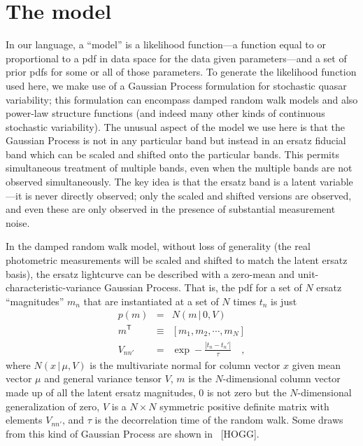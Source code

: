 \documentclass[letterpaper,12pt]{article}
\newcommand{\given}{\,|\,}
\newcommand{\transpose}[1]{{#1}^{\mathsf{T}}}
\begin{document}
\section{The model}

In our language, a ``model'' is a likelihood function---a function
equal to or proportional to a pdf in data space for the data given
parameters---and a set of prior pdfs for some or all of those
parameters.  To generate the likelihood function used here, we make
use of a Gaussian Process formulation for stochastic quasar
variability; this formulation can encompass damped random walk models
and also power-law structure functions (and indeed many other kinds of
continuous stochastic variability).  The unusual aspect of the model
we use here is that the Gaussian Process is not in any particular band
but instead in an ersatz fiducial band which can be scaled and shifted
onto the particular bands.  This permits simultaneous treatment of
multiple bands, even when the multiple bands are not observed
simultaneously.  The key idea is that the ersatz band is a latent
variable---it is never directly observed; only the scaled and shifted
versions are observed, and even these are only observed in the
presence of substantial measurement noise.

In the damped random walk model, without loss of generality (the real
photometric measurements will be scaled and shifted to match the
latent ersatz basis), the ersatz lightcurve can be described with a
zero-mean and unit-characteristic-variance Gaussian Process.  That is,
the pdf for a set of $N$ ersatz ``magnitudes'' $m_n$ that are
instantiated at a set of $N$ times $t_n$ is just
\begin{eqnarray}
p(m) &=& N(m\given 0,V)
\\
\transpose{m} &\equiv& [m_1, m_2, \cdots , m_N]
\\
V_{nn'} &=& \exp -\frac{|t_n - t_n'|}{\tau}
\quad ,
\end{eqnarray}
where $N(x\given\mu,V)$ is the multivariate normal for column vector
$x$ given mean vector $\mu$ and general variance tensor $V$, $m$ is
the $N$-dimensional column vector made up of all the latent ersatz
magnitudes, $0$ is not zero but the $N$-dimensional generalization of
zero, $V$ is a $N\times N$ symmetric positive definite matrix with
elements $V_{nn'}$, and $\tau$ is the decorrelation time of the random
walk.  Some draws from this kind of Gaussian Process are shown in
\figurename~[HOGG].
\end{document}
